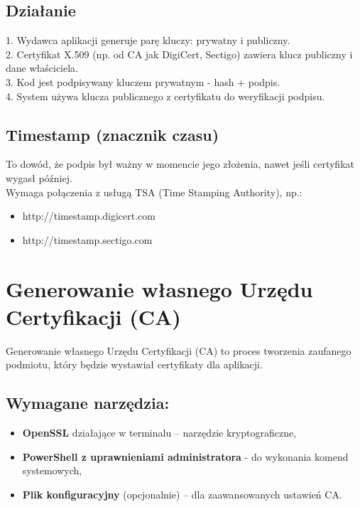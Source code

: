 \documentclass{article}
\begin{document}
\subsection*{Działanie}
1. Wydawca aplikacji generuje parę kluczy: prywatny i publiczny.\\
2. Certyfikat X.509 (np. od CA jak DigiCert, Sectigo) zawiera klucz publiczny i dane właściciela.\\
3. Kod jest podpisywany kluczem prywatnym -  hash + podpis.\\
4. System używa klucza publicznego z certyfikatu do weryfikacji podpisu.

\subsection*{Timestamp (znacznik czasu)}
To dowód, że podpis był ważny w momencie jego złożenia, nawet jeśli certyfikat wygasł później.\\

Wymaga połączenia z usługą TSA (Time Stamping Authority), np.:
\begin{itemize}
    \item http://timestamp.digicert.com
    \item http://timestamp.sectigo.com
\end{itemize}



\section{Generowanie własnego Urzędu Certyfikacji (CA)}
Generowanie własnego Urzędu Certyfikacji (CA) to proces tworzenia zaufanego podmiotu, który będzie wystawiał certyfikaty dla aplikacji. \\
\subsection{Wymagane narzędzia: }
\begin{itemize}
    \item \textbf{OpenSSL} działające w terminalu – narzędzie kryptograficzne,
    \item \textbf{PowerShell z uprawnieniami administratora} - do wykonania komend systemowych,
    \item \textbf{Plik konfiguracyjny} (opcjonalnie) – dla zaawansowanych ustawień CA. \\
\end{itemize}
\end{document}
